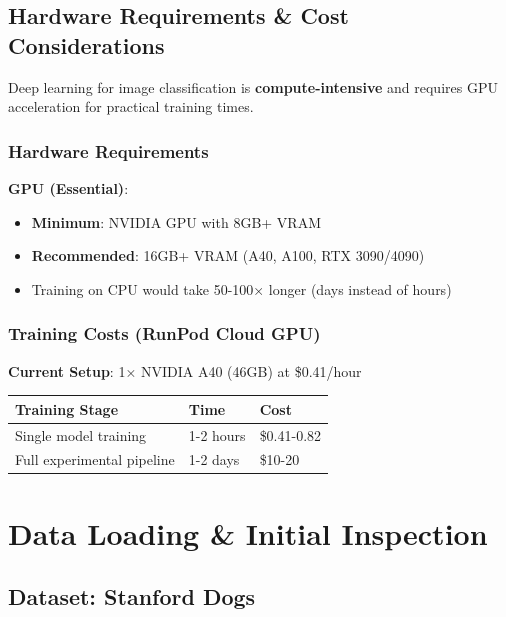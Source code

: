 \documentclass[
  letterpaper,
  DIV=11,
  numbers=noendperiod]{scrartcl}
\providecommand{\tightlist}{%
  \setlength{\itemsep}{0pt}\setlength{\parskip}{0pt}}
\begin{document}
\subsection{Hardware Requirements \& Cost
Considerations}\label{hardware-requirements-cost-considerations}

Deep learning for image classification is \textbf{compute-intensive} and
requires GPU acceleration for practical training times.

\subsubsection{Hardware Requirements}\label{hardware-requirements}

\textbf{GPU (Essential)}:

\begin{itemize}
\tightlist
\item
  \textbf{Minimum}: NVIDIA GPU with 8GB+ VRAM
\item
  \textbf{Recommended}: 16GB+ VRAM (A40, A100, RTX 3090/4090)
\item
  Training on CPU would take 50-100× longer (days instead of hours)
\end{itemize}

\subsubsection{Training Costs (RunPod Cloud
GPU)}\label{training-costs-runpod-cloud-gpu}

\textbf{Current Setup}: 1× NVIDIA A40 (46GB) at \$0.41/hour

\begin{longtable}[]{@{}lll@{}}
\toprule\noalign{}
Training Stage & Time & Cost \\
\midrule\noalign{}
\endhead
\bottomrule\noalign{}
\endlastfoot
Single model training & 1-2 hours & \$0.41-0.82 \\
Full experimental pipeline & 1-2 days & \$10-20 \\
\end{longtable}

\section{Data Loading \& Initial
Inspection}\label{data-loading-initial-inspection}

\subsection{Dataset: Stanford Dogs}\label{dataset-stanford-dogs}
\end{document}
